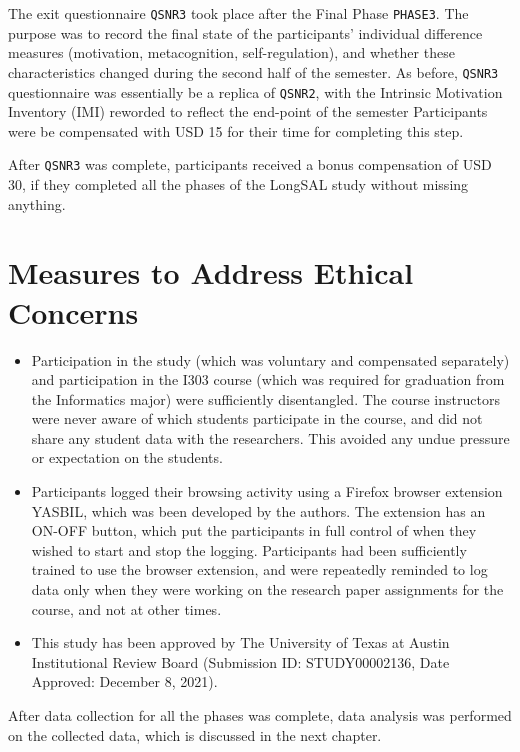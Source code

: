 \documentclass[letterpaper, nobind]{templates/ociamthesis}
\begin{document}
The exit questionnaire \texttt{QSNR3} took place after the Final Phase \texttt{PHASE3}.
The purpose was to record the final state of the participants' individual difference measures (motivation, metacognition, self-regulation), and whether these characteristics changed during the second half of the semester.
As before, \texttt{QSNR3} questionnaire was essentially be a replica of \texttt{QSNR2}, with the Intrinsic Motivation Inventory (IMI) reworded to reflect the end-point of the semester
Participants were be compensated with USD 15 for their time for completing this step.

After \texttt{QSNR3} was complete, participants received a bonus compensation of USD 30, if they completed all the phases of the LongSAL study without missing anything.

\hypertarget{measures-to-address-ethical-concerns}{%
\section{Measures to Address Ethical Concerns}\label{measures-to-address-ethical-concerns}}

\begin{itemize}
\item
  Participation in the study (which was voluntary and compensated separately) and participation in the I303 course (which was required for graduation from the Informatics major) were sufficiently disentangled. The course instructors were never aware of which students participate in the course, and did not share any student data with the researchers. This avoided any undue pressure or expectation on the students.
\item
  Participants logged their browsing activity using a Firefox browser extension YASBIL, which was been developed by the authors. The extension has an ON-OFF button, which put the participants in full control of when they wished to start and stop the logging. Participants had been sufficiently trained to use the browser extension, and were repeatedly reminded to log data only when they were working on the research paper assignments for the course, and not at other times.
\item
  This study has been approved by The University of Texas at Austin Institutional Review Board (Submission ID: STUDY00002136, Date Approved: December 8, 2021).
\end{itemize}

After data collection for all the phases was complete, data analysis was performed on the collected data, which is discussed in the next chapter.
\end{document}
